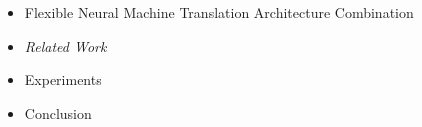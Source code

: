 \begin{frame}

\begin{itemize}
    \item Flexible Neural Machine Translation Architecture Combination
    \item \emph{\color{UOYellow}Related Work}
    \item Experiments
    \item Conclusion
\end{itemize}

\end{frame}
